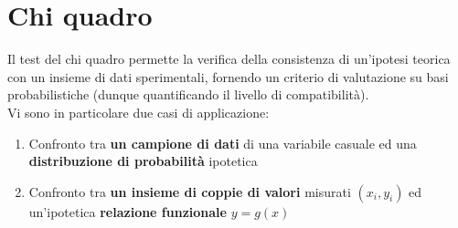 \documentclass[10pt, oneside]{book}
\begin{document}
\chapter{Chi quadro}
Il test del chi quadro permette la verifica della consistenza di un'ipotesi teorica con un insieme di dati sperimentali, fornendo un criterio di valutazione su basi probabilistiche (dunque quantificando il livello di compatibilità).\\
Vi sono in particolare due casi di applicazione:
\begin{enumerate}
\item Confronto tra \textbf{un campione di dati} di una variabile casuale ed una \textbf{distribuzione di probabilità} ipotetica
\item Confronto tra \textbf{un insieme di coppie di valori} misurati $(x_i, y_i)$ ed un'ipotetica \textbf{relazione funzionale} $y = g(x)$
\end{enumerate}
\end{document}
